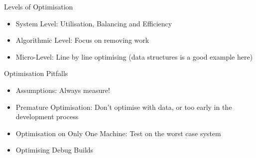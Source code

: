 \begin{frame}{Levels of Optimisation}
	\begin{itemize}
		\pause \item System Level: Utilisation, Balancing and Efficiency
		\pause \item Algorithmic Level: Focus on removing work
		\pause \item Micro-Level: Line by line optimising (data structures is a good example here)
	\end{itemize}
\end{frame}

\begin{frame}{Optimisation Pitfalls}
	\begin{itemize}
		\pause \item Assumptions: Always measure!
		\pause \item Premature Optimisation: Don't optimise with data, or too early in the development process
		\pause \item Optimisation on Only One Machine: Test on the worst case system
		\pause \item Optimising Debug Builds
	\end{itemize}
\end{frame}


